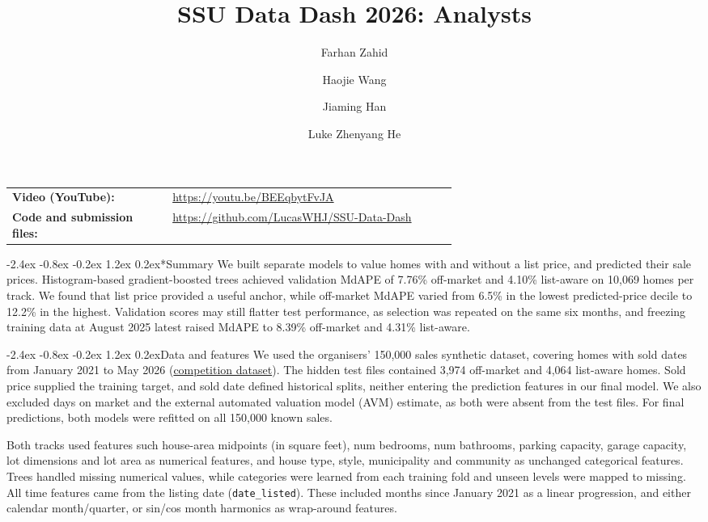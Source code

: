 \documentclass[11pt,a4paper]{article}
\title{SSU Data Dash 2026: Analysts}
\author{Farhan Zahid \and Haojie Wang \and Jiaming Han \and Luke Zhenyang He}
\date{}
\makeatletter
\renewcommand\section{\@startsection{section}{1}{\z@}
  {-2.4ex \@plus -0.8ex \@minus -0.2ex}
  {1.2ex \@plus 0.2ex}{\normalfont\Large\bfseries}}
\makeatother
\begin{document}
\maketitle
\vspace{-1.7em}

\noindent\begin{tabular}{@{}lp{0.64\linewidth}@{}}
\textbf{Video (YouTube):} & \url{https://youtu.be/BEEqbytFvJA} \\
\textbf{Code and submission files:} & \url{https://github.com/LucasWHJ/SSU-Data-Dash} \\
\end{tabular}

\section*{Summary}
We built separate models to value homes with and without a list price, and predicted their sale prices.
Histogram-based gradient-boosted trees achieved validation MdAPE of 7.76\% off-market and 4.10\% list-aware on
10,069 homes per track. We found that list price provided a useful anchor, while off-market MdAPE varied from
6.5\% in the lowest predicted-price decile to 12.2\% in the highest.
Validation scores may still flatter test performance, as selection was repeated on the same six months,
and freezing training data at August 2025 latest raised MdAPE to 8.39\% off-market and 4.31\% list-aware.

\section{Data and features}
We used the organisers' 150,000 sales synthetic dataset, covering homes with sold dates from January 2021 to May 2026
(\href{https://huggingface.co/datasets/Baliyang/SSU_data_dash}{competition dataset}).
The hidden test files contained 3,974 off-market and 4,064 list-aware homes. Sold price supplied the
training target, and sold date defined historical splits, neither entering the prediction features in our final model.
We also excluded days on market and the external automated valuation model (AVM) estimate, as both were
absent from the test files.
For final predictions, both models were refitted on all 150,000 known sales.

Both tracks used features such house-area midpoints (in square feet), num bedrooms, num bathrooms, parking capacity, garage capacity, lot dimensions
and lot area as numerical features, and house type, style, municipality and community as unchanged categorical features. Trees handled missing numerical values,
while categories were learned from each training fold and unseen levels were mapped to missing.
All time features came from the listing date (\verb|date_listed|). These included months since
January 2021 as a linear progression, and either calendar month/quarter, or sin/cos month harmonics as wrap-around features.
\end{document}
